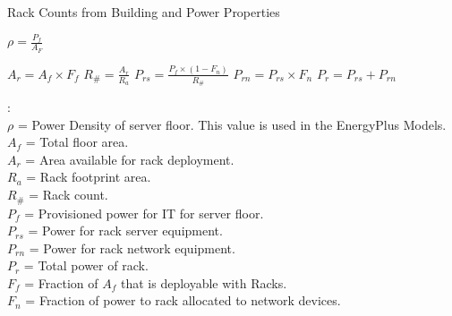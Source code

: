   \begin{algorithm}
    \caption{Rack Counts from Building and Power Properties}
    \begin{algorithmic}

      \STATE $\rho= \frac{P_{f}}{A_{F}}$

      \STATE $A_{r}= A_{f} \times F_{f}$
      \STATE $R_{\#}= \frac{A_{r}}{R_{a}}$
      \STATE $P_{rs} = \frac{P_f \times (1-F_{n})}{R_{\#}}$
      \STATE $P_{rn} = P_{rs} \times F_{n}$
      \STATE $P_r = P_{rs} + P_{rn}$
      
      : \\
        \hspace{.2in}$\rho$ = Power Density of server floor. This value is used in the EnergyPlus Models. \\
        \hspace{.2in}$A_{f}$ = Total floor area.  \\
        \hspace{.2in}$A_{r}$ = Area available for rack deployment.  \\
        \hspace{.2in}$R_{a}$ = Rack footprint area. \\
        \hspace{.2in}$R_{\#}$ = Rack count.\\
        \hspace{.2in}$P_{f}$ = Provisioned power for IT for server floor.\\
        \hspace{.2in}$P_{rs}$ = Power for rack server equipment. \\
        \hspace{.2in}$P_{rn}$ = Power for rack network equipment. \\
        \hspace{.2in}$P_{r}$ = Total power of rack. \\
        \hspace{.2in}$F_{f}$ = Fraction of $A_{f}$ that is deployable with Racks.\\
        \hspace{.2in}$F_{n}$ = Fraction of power to rack allocated to network devices.
        
        
        
    \end{algorithmic}
    \label{rack_power_counts}
  \end{algorithm}